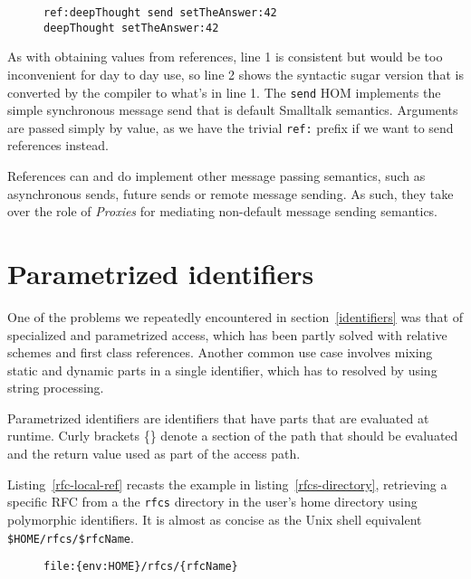 \documentclass[preprint,authoryear]{acm_proc_article-sp}
\begin{document}
\begin{figure}[htbp]
\begin{lstlisting}[style=numbers,label=message-via-ref,caption=Message sending via reference and with syntactic sugar]
ref:deepThought send setTheAnswer:42
deepThought setTheAnswer:42
\end{lstlisting}
\end{figure}

As with obtaining values from references, line 1 is consistent but would be too inconvenient for day to day use,
so line 2 shows the syntactic sugar version that is converted by the compiler to what's in line 1.  The {\tt send}
HOM implements the simple synchronous message send that is default Smalltalk semantics.   Arguments
are passed simply by value, as we have the trivial {\tt ref:} prefix if we want to send references instead.

References can and do implement other message passing semantics, such as asynchronous sends, future
sends or remote message sending.  As such, they take over the role of {\em Proxies} for mediating non-default
message sending semantics.  

\section{Parametrized identifiers}
\label{parametrized}

One of the problems we repeatedly encountered in section~\ref{identifiers} was 
that of specialized and parametrized access, which has been partly solved with
relative schemes and first class references.  Another common use case involves
mixing static and dynamic parts in a single identifier, which has to resolved by
using string processing.

Parametrized identifiers are identifiers that have parts that are evaluated
at runtime.  Curly brackets \{\} denote a section of the path that should be evaluated and
the return value used as part of the access path.

Listing~\ref{rfc-local-ref} recasts the example in listing~\ref{rfcs-directory}, retrieving a specific RFC from a 
the {\tt rfcs} directory in the user's home directory using polymorphic identifiers.  It is almost
as concise as the Unix shell equivalent {\tt \$HOME/rfcs/\$rfcName}.

\begin{figure}[htbp]
\begin{lstlisting}[style=L,label=rfc-local-ref,caption=Parametrized identifier for local RFC access.]
file:{env:HOME}/rfcs/{rfcName}
\end{lstlisting}
\end{figure}
\end{document}
